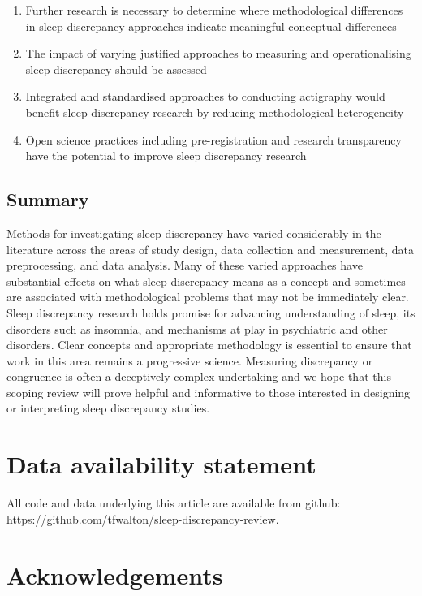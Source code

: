 \documentclass[
]{article}
\providecommand{\tightlist}{%
  \setlength{\itemsep}{0pt}\setlength{\parskip}{0pt}}
\begin{document}
\begin{enumerate}
\def\labelenumi{\arabic{enumi}.}
\tightlist
\item
  Further research is necessary to determine where methodological differences in sleep discrepancy approaches indicate meaningful conceptual differences
\item
  The impact of varying justified approaches to measuring and operationalising sleep discrepancy should be assessed
\item
  Integrated and standardised approaches to conducting actigraphy would benefit sleep discrepancy research by reducing methodological heterogeneity
\item
  Open science practices including pre-registration and research transparency have the potential to improve sleep discrepancy research
\end{enumerate}

\subsection{Summary}\label{item21}

Methods for investigating sleep discrepancy have varied considerably in the literature across the areas of study design, data collection and measurement, data preprocessing, and data analysis. Many of these varied approaches have substantial effects on what sleep discrepancy means as a concept and sometimes are associated with methodological problems that may not be immediately clear. Sleep discrepancy research holds promise for advancing understanding of sleep, its disorders such as insomnia, and mechanisms at play in psychiatric and other disorders. Clear concepts and appropriate methodology is essential to ensure that work in this area remains a progressive science. Measuring discrepancy or congruence is often a deceptively complex undertaking and we hope that this scoping review will prove helpful and informative to those interested in designing or interpreting sleep discrepancy studies.

\section{Data availability statement}\label{data-availability-statement}

All code and data underlying this article are available from github: \url{https://github.com/tfwalton/sleep-discrepancy-review}.

\section{Acknowledgements}\label{acknowledgements}
\end{document}
